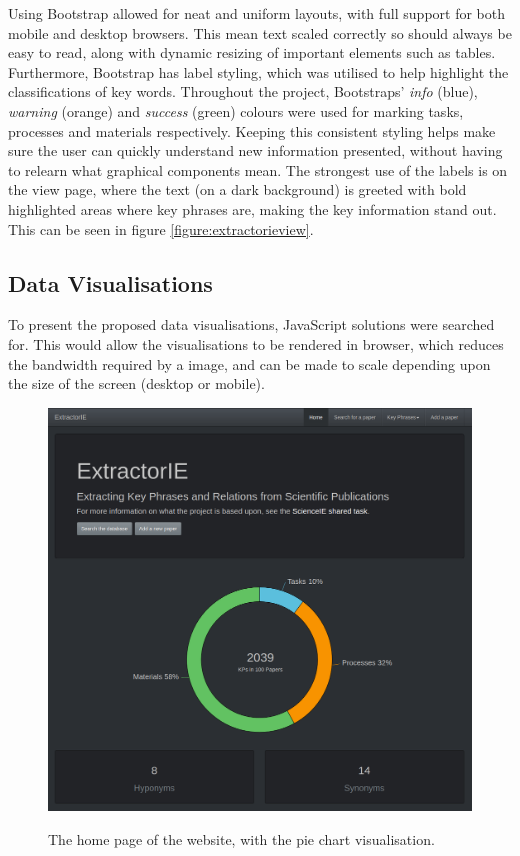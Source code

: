 Using Bootstrap allowed for neat and uniform layouts, with full support for both mobile and desktop browsers. This mean text scaled correctly so should always be easy to read, along with dynamic resizing of important elements such as tables. Furthermore, Bootstrap has label styling, which was utilised to help highlight the classifications of key words. Throughout the project, Bootstraps' \textit{info} (blue), \textit{warning} (orange) and \textit{success} (green) colours were used for marking tasks, processes and materials respectively. Keeping this consistent styling helps make sure the user can quickly understand new information presented, without having to relearn what graphical components mean. The strongest use of the labels is on the view page, where the text (on a dark background) is greeted with bold highlighted areas where key phrases are, making the key information stand out. This can be seen in figure \ref{figure:extractorieview}.

\subsection*{Data Visualisations}
To present the proposed data visualisations, JavaScript solutions were searched for. This would allow the visualisations to be rendered in browser, which reduces the bandwidth required by a image, and can be made to scale depending upon the size of the screen (desktop or mobile).

\begin{figure}
	\centering
	\includegraphics[width=12cm]{img/extractorie-home.png} \\
	\caption[The home page of the website]{The home page of the website, with the pie chart visualisation.}
	\label{figure:extractoriehome}
\end{figure}

